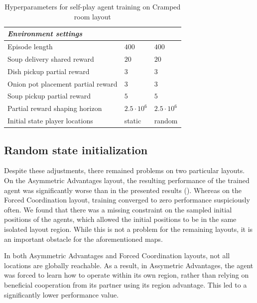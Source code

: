 \begin{table}[htbp]
\begin{tabular}{lll}
      \textit{Environment settings}                &                                   &                                   \\ \midrule                                
      Episode length                               & $400$                             & $400$                             \\
      Soup delivery shared reward                  & $20$                              & $20$                              \\
      Dish pickup partial reward                   & $3$                               & $3$                               \\
      Onion pot placement partial reward           & $3$                               & $3$                               \\
      Soup pickup partial reward                   & $5$                               & $5$                               \\
      Partial reward shaping horizon               & $2.5\cdot 10^6$                   & $2.5\cdot 10^6$                   \\
      Initial state player locations               & static                            & random                            \\
     \bottomrule
    \end{tabular}
    \caption{Hyperparameters for self-play agent training on Cramped room layout}
    \label{tab:hyperparameters-algo}
  \end{table}
  


\subsection{Random state initialization}
Despite these adjustments, there remained problems on two particular layouts.
On the Asymmetric Advantages layout, the resulting performance of the trained agent was significantly worse than in the presented results (\cite{carroll2020utility}).
Whereas on the Forced Coordination layout, training converged to zero performance suspiciously often.
We found that there was a missing constraint on the sampled initial positions of the agents, which allowed the initial positions to be in the same isolated layout region.
While this is not a problem for the remaining layouts, it is an important obstacle for the aforementioned maps.

In both Asymmetric Advantages and Forced Coordination layouts, not all locations are globally reachable.
As a result, in Assymetric Advantages, the agent was forced to learn how to operate within its own region, rather than relying on beneficial cooperation from its partner using its region advantage.
This led to a significantly lower performance value.


